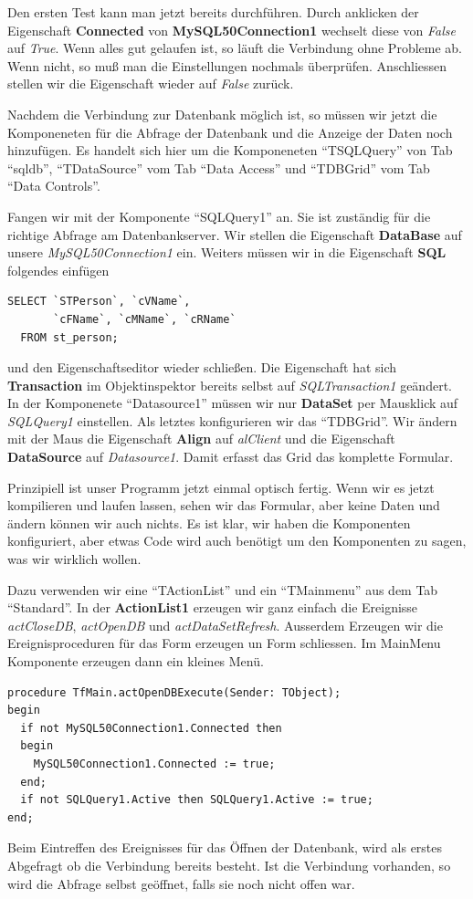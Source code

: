 Den ersten Test kann man jetzt bereits durchführen. Durch anklicken der Eigenschaft \textbf{Connected} von \textbf{MySQL50Connection1} wechselt diese von \emph{False} auf \emph{True}. Wenn alles gut gelaufen ist, so läuft die Verbindung ohne Probleme ab. Wenn nicht, so muß man die Einstellungen nochmals überprüfen. Anschliessen stellen wir die Eigenschaft wieder auf \emph{False} zurück.

Nachdem die Verbindung zur Datenbank möglich ist, so müssen wir jetzt die Komponeneten für die Abfrage der Datenbank und die Anzeige der Daten noch hinzufügen. Es handelt sich hier um die Komponeneten "`TSQLQuery"' von Tab "`sqldb"', "`TDataSource"' vom Tab "`Data Access"' und "`TDBGrid"' vom Tab "`Data Controls"'.

Fangen wir mit der Komponente "`SQLQuery1"' an. Sie ist zuständig für die richtige Abfrage am Datenbankserver. Wir stellen die Eigenschaft \textbf{DataBase} auf unsere \emph{MySQL50Connection1} ein. Weiters müssen wir in die Eigenschaft \textbf{SQL} folgendes einfügen
\begin{verbatim}
SELECT `STPerson`, `cVName`, 
       `cFName`, `cMName`, `cRName`
  FROM st_person;
\end{verbatim}
und den Eigenschaftseditor wieder schließen. Die Eigenschaft hat sich \textbf{Transaction} im Objektinspektor bereits selbst auf \emph{SQLTransaction1} geändert. In der Komponenete "`Datasource1"' müssen wir nur \textbf{DataSet} per Mausklick auf \emph{SQLQuery1} einstellen. Als letztes konfigurieren wir das "`TDBGrid"'. Wir ändern mit der Maus die Eigenschaft \textbf{Align} auf \emph{alClient} und die Eigenschaft \textbf{DataSource} auf \emph{Datasource1}. Damit erfasst das Grid das komplette Formular. 

Prinzipiell ist unser Programm jetzt einmal optisch fertig. Wenn wir es jetzt kompilieren und laufen lassen, sehen wir das Formular, aber keine Daten und ändern können wir auch nichts. Es ist klar, wir haben die Komponenten konfiguriert, aber etwas Code wird auch benötigt um den Komponenten zu sagen, was wir wirklich wollen.

Dazu verwenden wir eine "`TActionList"' und ein "`TMainmenu"' aus dem Tab "`Standard"'. In der \textbf{ActionList1} erzeugen wir ganz einfach die Ereignisse \emph{actCloseDB}, \emph{actOpenDB} und \emph{actDataSetRefresh}. Ausserdem Erzeugen wir die Ereignisproceduren für das Form erzeugen un Form schliessen. Im MainMenu Komponente erzeugen dann ein kleines Menü.

\begin{verbatim}
procedure TfMain.actOpenDBExecute(Sender: TObject);
begin
  if not MySQL50Connection1.Connected then
  begin
    MySQL50Connection1.Connected := true;
  end;
  if not SQLQuery1.Active then SQLQuery1.Active := true;
end;
\end{verbatim}
Beim Eintreffen des Ereignisses für das Öffnen der Datenbank, wird als erstes Abgefragt ob die Verbindung bereits besteht. Ist die Verbindung vorhanden, so wird die Abfrage selbst geöffnet, falls sie noch nicht offen war.

